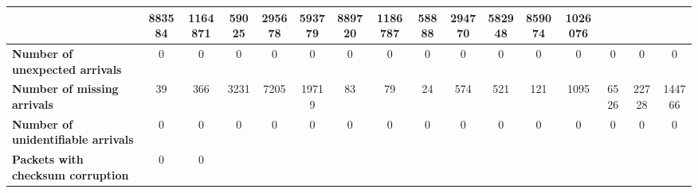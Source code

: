 \begin{table}[!h]
{\begin{tabular}{|l|ccccc|ccccc|ccccc|}
            & \multicolumn{1}{c|}{883584}
            & \multicolumn{1}{c|}{1164871}
            & \multicolumn{1}{c|}{59025}
            & \multicolumn{1}{c|}{295678}
            & \multicolumn{1}{c|}{593779}
            & \multicolumn{1}{c|}{889720}
            & \multicolumn{1}{c|}{1186787}
            & \multicolumn{1}{c|}{58888}
            & \multicolumn{1}{c|}{294770}
            & \multicolumn{1}{c|}{582948}
            & \multicolumn{1}{c|}{859074}
            & \multicolumn{1}{c|}{1026076}
            \\ \hline
            \textbf{Number of unexpected arrivals} & \multicolumn{1}{c|}{0} & \multicolumn{1}{c|}{0}
            & \multicolumn{1}{c|}{0}
            & \multicolumn{1}{c|}{0}
            & \multicolumn{1}{c|}{0}
            & \multicolumn{1}{c|}{0}
            & \multicolumn{1}{c|}{0}
            & \multicolumn{1}{c|}{0}
            & \multicolumn{1}{c|}{0}
            & \multicolumn{1}{c|}{0}
            & \multicolumn{1}{c|}{0}
            & \multicolumn{1}{c|}{0}
            & \multicolumn{1}{c|}{0}
            & \multicolumn{1}{c|}{0}
            & \multicolumn{1}{c|}{0}
            \\ \hline
            \textbf{Number of missing arrivals} & \multicolumn{1}{c|}{39} & \multicolumn{1}{c|}{366}
            & \multicolumn{1}{c|}{3231}
            & \multicolumn{1}{c|}{7205}
            & \multicolumn{1}{c|}{19719}
            & \multicolumn{1}{c|}{83}
            & \multicolumn{1}{c|}{79}
            & \multicolumn{1}{c|}{24}
            & \multicolumn{1}{c|}{574}
            & \multicolumn{1}{c|}{521}
            & \multicolumn{1}{c|}{121}
            & \multicolumn{1}{c|}{1095}
            & \multicolumn{1}{c|}{6526}
            & \multicolumn{1}{c|}{22728}
            & \multicolumn{1}{c|}{144766}
            \\ \hline
            \textbf{Number of unidentifiable arrivals} & \multicolumn{1}{c|}{0} & \multicolumn{1}{c|}{0}
            & \multicolumn{1}{c|}{0}
            & \multicolumn{1}{c|}{0}
            & \multicolumn{1}{c|}{0}
            & \multicolumn{1}{c|}{0}
            & \multicolumn{1}{c|}{0}
            & \multicolumn{1}{c|}{0}
            & \multicolumn{1}{c|}{0}
            & \multicolumn{1}{c|}{0}
            & \multicolumn{1}{c|}{0}
            & \multicolumn{1}{c|}{0}
            & \multicolumn{1}{c|}{0}
            & \multicolumn{1}{c|}{0}
            & \multicolumn{1}{c|}{0}
            \\ \hline
            \textbf{Packets with checksum corruption} & \multicolumn{1}{c|}{0} & \multicolumn{1}{c|}{0}

\end{tabular}}
\end{table}
